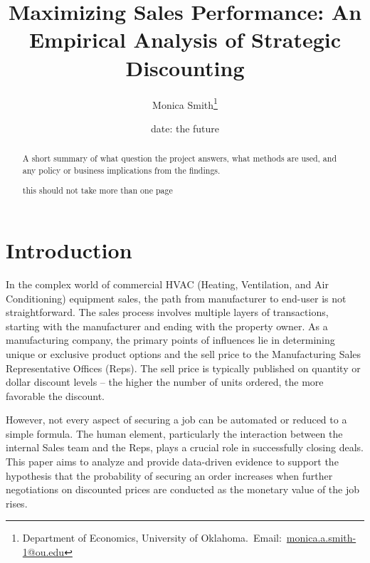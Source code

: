 \documentclass[12pt,english]{article}
\begin{document}
\begin{singlespace}
\title{Maximizing Sales Performance: An Empirical Analysis of Strategic Discounting}
\end{singlespace}

\author{Monica Smith\thanks{Department of Economics, University of Oklahoma.\
Email:~\href{mailto:student.name@ou.edu}{monica.a.smith-1@ou.edu}}}

\date{date: the future}

\maketitle

\begin{abstract}
\begin{singlespace}
A short summary of what question the project answers, what methods are used, and any policy or business implications from the findings.


this should not take more than one page
\end{singlespace}

\end{abstract}
\vfill{}

\newpage
\section{Introduction}

In the complex world of commercial HVAC (Heating, Ventilation, and Air Conditioning) equipment sales, the path from manufacturer to end-user is not straightforward. The sales process involves multiple layers of transactions, starting with the manufacturer and ending with the property owner. As a manufacturing company, the primary points of influences lie in determining unique or exclusive product options and the sell price to the Manufacturing Sales Representative Offices (Reps). The sell price is typically published on quantity or dollar discount levels – the higher the number of units ordered, the more favorable the discount. 

However, not every aspect of securing a job can be automated or reduced to a simple formula. The human element, particularly the interaction between the internal Sales team and the Reps, plays a crucial role in successfully closing deals. This paper aims to analyze and provide data-driven evidence to support the hypothesis that the probability of securing an order increases when further negotiations on discounted prices are conducted as the monetary value of the job rises.
\end{document}
